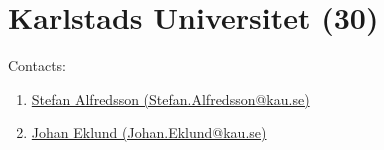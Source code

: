 \section{Karlstads Universitet (30)}
\label{sec:KAU}

Contacts:\begin{enumerate}
 \item {}\href{mailto:Stefan.Alfredsson@kau.se}{Stefan Alfredsson (Stefan.Alfredsson@kau.se)}
 \item {}\href{mailto:Johan.Eklund@kau.se}{Johan Eklund (Johan.Eklund@kau.se)}
\end{enumerate}

